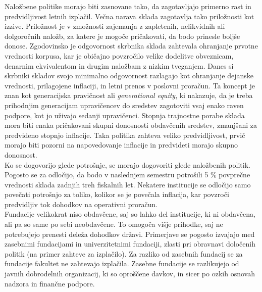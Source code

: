 \documentclass[12pt, a4paper]{article}
\begin{document}
Naložbene politike morajo biti zasnovane tako, da zagotavljajo primerno rast in predvidljivost letnih izplačil. Večna narava sklada zagotavlja tako priložnosti kot izzive. Priložnost je v zmožnosti zajemanja z zapletenih, nelikvidnih ali dolgoročnih naložb, za katere je mogoče pričakovati, da bodo prinesle boljše donose. Zgodovinsko je odgovornost skrbnika sklada zahtevala ohranjanje prvotne vrednosti korpusa, kar je običajno povzročilo velike dodelitve obveznicam, denarnim ekvivalentom in drugim naložbam z nizkim tveganjem. Danes si skrbniki skladov svojo minimalno odgovornost razlagajo kot ohranjanje dejanske vrednosti, prilagojene inflaciji, in letni prenos v poslovni proračun. Ta koncept je znan kot generacijska pravičnost ali \textit{generational equity}, ki nakazuje, da je treba prihodnjim generacijam upravičencev do sredstev zagotoviti vsaj enako raven podpore, kot jo uživajo sedanji upravičenci. Stopnja trajnostne porabe sklada mora biti enaka pričakovani skupni donosnosti obdavčenih sredstev, zmanjšani za predvideno stopnjo inflacije. Taka politika zahteva veliko predvidljivost, prvič morajo biti pozorni na napovedovanje inflacije in predvideti morajo skupno donosnost. \\

Ko se dogovorijo glede potrošnje, se morajo dogovoriti glede naložbenih politik. Pogosto se za odločijo, da bodo v naslednjem semestru potrošili 5 \% povprečne vrednosti sklada zadnjih treh fiskalnih let. Nekatere institucije se odločijo samo povečati potrošnjo za toliko, kolikor se je povečala inflacija, kar povzroči predvidljiv tok dohodkov na operativni proračun. \cite{investment1}\\

Fundacije velikokrat niso obdavčene, saj so lahko del institucije, ki ni obdavčena, ali pa so same po sebi neobdavčene. To omogoča višje prihodke, saj ne potrebujejo prenesti deleža dohodkov državi. Primerjave se pogosto izvajajo med zasebnimi fundacijami in univerzitetnimi fundaciji, zlasti pri obravnavi določenih politik (na primer zahteve za izplačilo). Za razliko od zasebnih fundacij se za fundacije fakultet ne zahtevajo izplačila. Zasebne fundacije se razlikujejo od javnih dobrodelnih organizacij, ki so oproščene davkov, in sicer po ozkih osnovah nadzora in finančne podpore.\\
\end{document}
